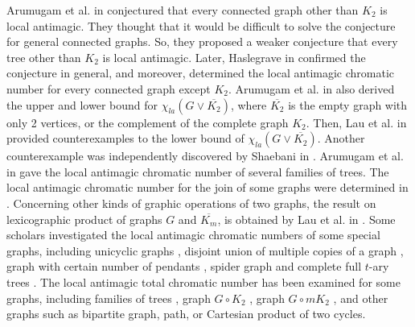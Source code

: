 \documentclass[12pt]{article}
\begin{document}
Arumugam et al. in \cite{Arumugam-1} conjectured that every connected graph other than $K_{2}$ is local antimagic. They thought that it would be difficult to solve the conjecture for general connected graphs. So, they proposed a weaker conjecture that every tree other than $K_{2}$ is local antimagic. Later,
Haslegrave in \cite{Haslegrave} confirmed the conjecture in general, and moreover, determined the local antimagic chromatic number for every connected graph except $K_{2}$.
Arumugam et al. in \cite{Arumugam-1} also derived the upper and lower bound for $\chi_{la}(G \vee \overline{K_{2}})$, where $\overline{K_{2}}$ is the empty graph with only 2 vertices, or the complement of the complete graph $K_{2}$.
Then, Lau et al. in \cite{Lau-1} provided counterexamples to the lower bound of $\chi_{la}(G \vee \overline{K_{2}})$. Another counterexample was independently discovered by Shaebani in \cite{Shaebani}.
Arumugam et al. in \cite{Arumugam-3} gave the local antimagic chromatic number of several families of trees. The local antimagic chromatic number for the join of some graphs were determined in \cite{Lau-1,Lau-2,Lau-3,Lau-4,Lau-6,Yang-1,Yang-2,Premalatha}.
Concerning other kinds of graphic operations of two graphs, the result on lexicographic product of graphs $G$ and $\overline{K_{m}}$, is obtained by Lau et al. in \cite{Lau-5}.
Some scholars investigated the local antimagic chromatic numbers of some special graphs, including unicyclic graphs \cite{Nazula}, disjoint union of multiple copies of a graph \cite{Baca}, graph with certain number of pendants \cite{Lau-8}, spider graph \cite{Lau-9} and complete full $t$-ary trees \cite{Baca-2}.
The local antimagic total chromatic number has been examined for some graphs, including families of trees \cite{Putri}, graph $G\circ K_{2}$ \cite{Kurniawati-1}, graph $G\circ mK_{2}$ \cite{Kurniawati-2}, and other graphs \cite{Lau-7} such as bipartite graph, path, or Cartesian product of two cycles.
\end{document}
